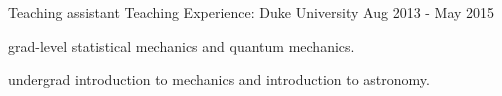 \begin{cventries}
  \cventry
    {Teaching assistant} %
    {Teaching Experience: } %
    {Duke University} %
    {Aug 2013 - May 2015} %
    {
      \begin{cvitems} %
      	\item {grad-level statistical mechanics and quantum mechanics.}
      	\item {undergrad introduction to mechanics and introduction to astronomy.}
      \end{cvitems}
    } 

\end{cventries}
